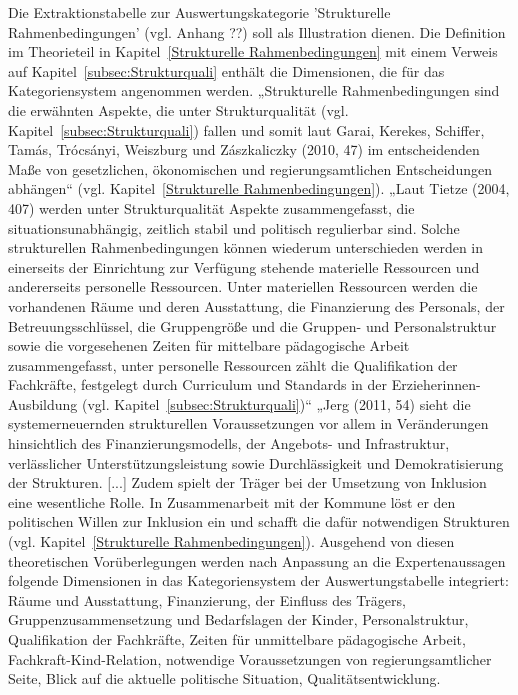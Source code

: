 Die Extraktionstabelle zur Auswertungskategorie 'Strukturelle Rahmenbedingungen' (vgl. Anhang ??) soll als Illustration dienen. 
Die Definition im Theorieteil in Kapitel~\ref{Strukturelle Rahmenbedingungen} mit einem Verweis auf Kapitel~\ref{subsec:Strukturquali} enthält die Dimensionen, die für das Kategoriensystem angenommen werden. „Strukturelle Rahmenbedingungen sind die erwähnten Aspekte, die unter Strukturqualität (vgl. Kapitel~\ref{subsec:Strukturquali}) fallen und somit laut Garai, Kerekes, Schiffer, Tamás, Trócsányi, Weiszburg und Zászkaliczky (2010, 47) im entscheidenden Maße von gesetzlichen, ökonomischen und regierungsamtlichen Entscheidungen abhängen“ (vgl. Kapitel~\ref{Strukturelle Rahmenbedingungen}).
„Laut Tietze (2004, 407) werden unter Strukturqualität Aspekte zusammengefasst, die situationsunabhängig, zeitlich stabil und politisch regulierbar sind. Solche strukturellen Rahmenbedingungen können wiederum unterschieden werden in einerseits der Einrichtung zur Verfügung stehende materielle Ressourcen und andererseits personelle Ressourcen. Unter materiellen Ressourcen werden die vorhandenen Räume und deren Ausstattung, die Finanzierung des Personals, der Betreuungsschlüssel, die Gruppengröße und die Gruppen- und Personalstruktur sowie die vorgesehenen Zeiten für mittelbare pädagogische Arbeit zusammengefasst, unter personelle Ressourcen zählt die Qualifikation der Fachkräfte, festgelegt durch Curriculum und Standards in der Erzieherinnen-Ausbildung (vgl. Kapitel~\ref{subsec:Strukturquali})“ 
„Jerg (2011, 54) sieht die systemerneuernden strukturellen Voraussetzungen vor allem in Veränderungen hinsichtlich des Finanzierungsmodells, der Angebots- und Infrastruktur, verlässlicher Unterstützungsleistung sowie Durchlässigkeit und Demokratisierung der Strukturen. [...] Zudem spielt der Träger bei der Umsetzung von Inklusion eine wesentliche Rolle. In Zusammenarbeit mit der Kommune löst er den politischen Willen zur Inklusion ein und schafft die dafür notwendigen Strukturen (vgl. Kapitel~\ref{Strukturelle Rahmenbedingungen}). 
Ausgehend von diesen theoretischen Vorüberlegungen werden nach Anpassung an die Expertenaussagen folgende Dimensionen in das Kategoriensystem der Auswertungstabelle integriert:  
Räume und Ausstattung, Finanzierung, der Einfluss des Trägers, Gruppenzusammensetzung und Bedarfslagen der Kinder, Personalstruktur, Qualifikation der Fachkräfte, Zeiten für unmittelbare pädagogische Arbeit, Fachkraft-Kind-Relation, notwendige Voraussetzungen von regierungsamtlicher Seite, Blick auf die aktuelle politische Situation, Qualitätsentwicklung.  


